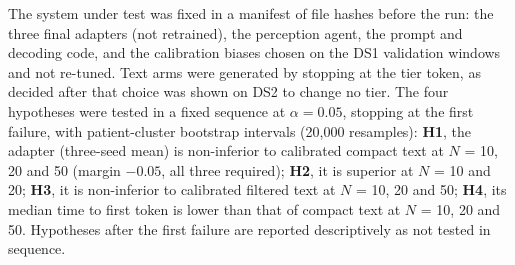 The system under test was fixed in a manifest of file hashes before the run: the three final adapters (not retrained), the perception agent, the prompt and decoding code, and the calibration biases chosen on the DS1 validation windows and not re-tuned. Text arms were generated by stopping at the tier token, as decided after that choice was shown on DS2 to change no tier. The four hypotheses were tested in a fixed sequence at $\alpha = 0.05$, stopping at the first failure, with patient-cluster bootstrap intervals (20,000 resamples): \textbf{H1}, the adapter (three-seed mean) is non-inferior to calibrated compact text at $N$ = 10, 20 and 50 (margin $-0.05$, all three required); \textbf{H2}, it is superior at $N$ = 10 and 20; \textbf{H3}, it is non-inferior to calibrated filtered text at $N$ = 10, 20 and 50; \textbf{H4}, its median time to first token is lower than that of compact text at $N$ = 10, 20 and 50. Hypotheses after the first failure are reported descriptively as not tested in sequence.

\begin{table}[t]
\caption{Hypotheses on INCART, fixed in advance. Estimates are adapter minus calibrated text (H1, H2), adapter minus calibrated filtered text (H3), or the median relative difference in time to first token (H4), with 95\% intervals. H4 was not tested in sequence because H3 failed. $^\dagger$The time-to-first-token value at 50 events is the technical re-measurement under the memory cap (see text); the original value ($-0.97$) was distorted by memory paging.}
\label{tab:incarthyp}
\centering
\footnotesize
{}
\end{table}

\begin{table}[t]
\caption{Balanced accuracy on INCART by number of events per prompt (adapter: mean of three seeds). Rule: the reference rule on the sender's outputs, 1 by construction.}
\label{tab:incartacc}
\centering
\footnotesize
{}
\end{table}

\begin{table}[t]
\caption{Routine windows escalated to priority or urgent on INCART.}
\label{tab:incartfa}
\centering
\footnotesize

\end{table}


